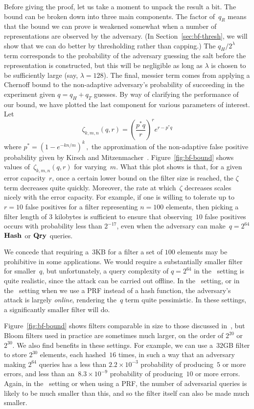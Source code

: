 Before giving the proof, let us take a moment to unpack the result a bit.  The
bound can be broken down into three main components. The factor
of~$q_R$ means that the bound we can prove is weakened somewhat when a number of
representations are observed by the adversary. (In Section~\ref{sec:bf-thresh},
we will show that we can do better by thresholding rather than capping.) The $q_H/2^\lambda$ term
corresponds to the probability of the adversary guessing the salt before the
representation is constructed, but this will be negligible as long as $\lambda$
is chosen to be sufficiently large (say, $\lambda=128$). The final, messier term
comes from applying a Chernoff bound to the non-adaptive adversary's probability
of succeeding in the experiment given $q = q_H+q_T$ guesses.
%
By way of clarifying the performance of our bound, we have plotted the last
component for various parameters of interest. Let
%
\begin{equation}\label{eq:zeta}
  \zeta_{k,m,n}(q,r) = \left(\frac{p^*q}{r}\right)^re^{r-p^*q}
\end{equation}
%
where
$
  p^* = (1-e^{-kn/m})^k \,,
$
the approximation of the non-adaptive false positive probability given by Kirsch
and Mitzenmacher~\cite{kirsch2006less}.
%
Figure~\ref{fig:bf-bound} shows values
of~$\zeta_{k,m,n}(q,r)$ for varying~$m$.
%
What this plot shows is that, for a given error capacity~$r$, once a certain lower
bound on the filter size is reached, the $\zeta$ term decreases quite quickly.
Moreover, the rate at which~$\zeta$ decreases scales nicely with the error
capacity.  For example, if one is willing to tolerate up to~$r=10$ false
positives for a filter representing $n=100$ elements, then picking a filter
length of $3$ kilobytes is sufficient to ensure that observing~$10$ false
positives occurs with probability less than $2^{-17}$, even when the adversary
can make~$q =2^{64}$ $\textup{\textbf{Hash}}\hspace{0.5pt}$ or $\textup{\textbf{Qry}}\hspace{0.5pt}$ queries.

We concede that requiring a~$3$KB for a filter a set of $100$ elements may be
prohibitive in some applications. We would require a substantially smaller
filter for smaller~$q$, but unfortunately, a query complexity of $q=2^{64}$ in
the \errep\ setting is quite realistic, since the attack can be carried out
offline.
%
In the \erreps\ setting, or in the \errep\ setting when we use a PRF instead of a
hash function, the adversary's attack is largely \emph{online}, rendering
the~$q$ term quite pessimistic. In these settings, a significantly smaller
filter will do.

Figure~\ref{fig:bf-bound} shows filters comparable in size to those discussed
in~\cite{gerbet2015power}, but Bloom filters used in practice are sometimes much
larger, on the order of $2^{20}$ or $2^{30}$. We also find benefits in these
settings. For example, we can use a~$32$GB filter to store $2^{30}$ elements,
each hashed~$16$ times, in
such a way that an adversary making $2^{64}$ queries has a less than
$2.2 \times 10^{-3}$ probability of producing~$5$ or more errors, and less than
an~$8.3 \times 10^{-9}$ probability of producing~$10$ or more errors. Again, in
the \erreps\ setting or when using a PRF, the number of adversarial queries is
likely to be much smaller than this, and so the filter itself can also be made
much smaller.

